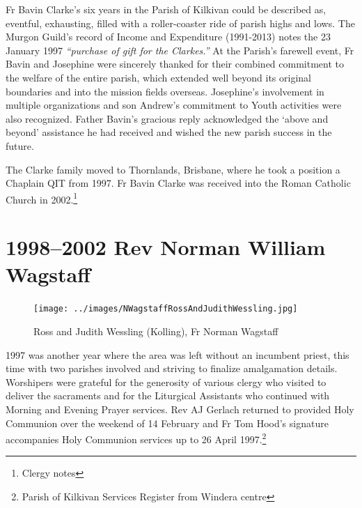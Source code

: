 Fr Bavin Clarke's six years in the Parish of Kilkivan could be described as, eventful, exhausting, filled with a roller-coaster ride of parish highs and lows. The Murgon Guild's record of Income and Expenditure (1991-2013) notes the 23 January 1997 \emph{``purchase of gift for the Clarkes.''} At the Parish's farewell event, Fr Bavin and Josephine were sincerely thanked for their combined commitment to the welfare of the entire parish, which extended well beyond its original boundaries and into the mission fields overseas. Josephine's involvement in multiple organizations and son Andrew's commitment to Youth activities were also recognized. Father Bavin's gracious reply acknowledged the `above and beyond' assistance he had received and wished the new parish success in the future.



The Clarke family moved to Thornlands, Brisbane, where he took a position a Chaplain QIT from 1997. Fr Bavin Clarke was received into the Roman Catholic Church in 2002.\footnote{Clergy notes}


\section{1998--2002 Rev Norman William Wagstaff}









\begin{figure}
\begin{center}
\texttt{[image: ../images/NWagstaffRossAndJudithWessling.jpg]}
\caption{Ross and Judith Wessling (Kolling), Fr Norman Wagstaff }
\end{center}
\end{figure}




1997 was another year where the area was left without an incumbent priest, this time with two parishes involved and striving to finalize amalgamation details. Worshipers were grateful for the generosity of various clergy who visited to deliver the sacraments and for the Liturgical Assistants who continued with Morning and Evening Prayer services. Rev AJ Gerlach returned to provided Holy Communion over the weekend of 14 February and Fr Tom Hood's signature accompanies Holy Communion services up to 26 April 1997.\footnote{Parish of Kilkivan Services Register from Windera centre}








